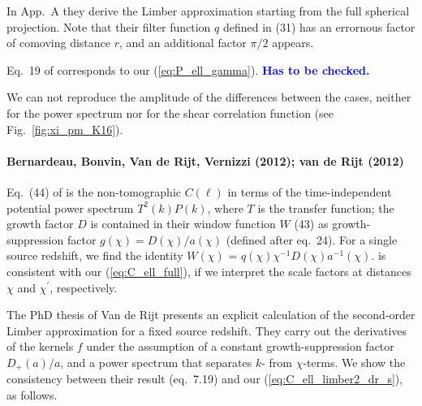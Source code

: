 \documentclass[useAMS,usenatbib]{mn2e} %
\newcommand{\mk}[1]{{\bf\textcolor{blue}{#1}}}
\begin{document}
\begin{appendix}
In App.~A they derive the Limber approximation starting from the full spherical
projection. Note that their filter function $q$ defined in (31) has an
errornous factor of comoving distance $r$, and an additional factor $\pi/2$
appears.

Eq.~19 of \cite{2016arXiv161104954K} corresponds to our
(\ref{eq:P_ell_gamma}). \mk{Has to be checked.}

We can not reproduce the amplitude of the differences between the cases, neither for
the power spectrum nor for the shear correlation function (see Fig.~\ref{fig:xi_pm_K16}).


\paragraph{Bernardeau, Bonvin, Van de Rijt, Vernizzi (2012); van de Rijt (2012)}

Eq.~(44) of \cite{2012PhRvD..86b3001B} is the non-tomographic $C(\ell)$ in
terms of the time-independent potential power spectrum $T^2(k) P(k)$, where $T$
is the transfer function; the growth factor $D$ is contained in their window
function $W$ (43) as growth-suppression factor $g(\chi) = D(\chi)/a(\chi)$
(defined after eq.~{24}). For a single source redshift, we find the identity
$W(\chi)$ = $q(\chi)\chi^{-1} D(\chi) a^{-1}(\chi)$.
\cite{2012PhRvD..86b3001B} is consistent with our
(\ref{eq:C_ell_full}), if we interpret the
scale factors at distances $\chi$ and $\chi^\prime$, respectively.

The PhD thesis of Van de Rijt \cite{vande2012} presents an explicit calculation
of the second-order Limber approximation for a fixed source redshift. They
carry out the derivatives of the kernels $f$ under the assumption of a constant
growth-suppression factor $D_+(a)/a$, and a power spectrum that separates $k$-
from $\chi$-terms. We show the consistency between their result (eq.~7.19) and
our (\ref{eq:C_ell_limber2_dr_s}), as follows.


\end{appendix}
\end{document}
